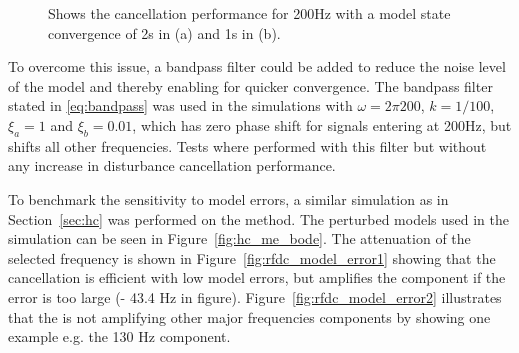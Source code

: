 \begin{figure}[h!]
  \centering %
  \qquad
  \caption{\label{fig:convergence} Shows the cancellation performance for 200Hz with a model state convergence of 2s in (a) and 1s in (b).}
\end{figure}

To overcome this issue, a bandpass filter could be added to reduce the noise level of the model and thereby enabling for quicker convergence. The bandpass filter stated in \eqref{eq:bandpass} was used in the simulations with $\omega=2\pi 200$, $k=1/100$, $\xi_a=1$ and $\xi_b=0.01$, which has zero phase shift for signals entering at 200Hz, but shifts all other frequencies. Tests where performed with this filter but without any increase in disturbance cancellation performance.

To benchmark the sensitivity to model errors, a similar simulation as in Section~\ref{sec:hc} was performed on the \abbrRFDC method. The perturbed models used in the simulation can be seen in Figure~\ref{fig:hc_me_bode}. The attenuation of the selected frequency is shown in Figure~\ref{fig:rfdc_model_error1} showing that the cancellation is efficient with low model errors, but amplifies the component if the error is too large (\abbrRFDC - 43.4 Hz in figure). Figure~\ref{fig:rfdc_model_error2} illustrates that the \abbrRFDC is not amplifying other major frequencies components by showing one example e.g. the 130 Hz component.

